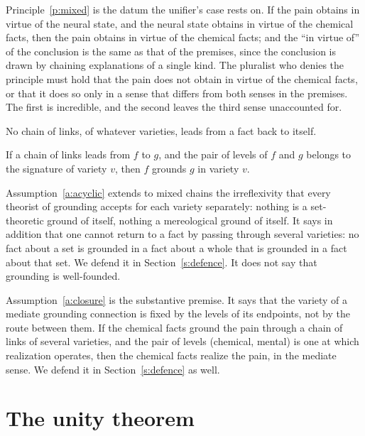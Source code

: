 \documentclass{situationist-preprint}
\begin{document}
Principle~\ref{p:mixed} is the datum the unifier's case rests on. If the pain obtains in virtue of the neural state, and the neural state obtains in virtue of the chemical facts, then the pain obtains in virtue of the chemical facts; and the \enquote{in virtue of} of the conclusion is the same as that of the premises, since the conclusion is drawn by chaining explanations of a single kind. The pluralist who denies the principle must hold that the pain does not obtain in virtue of the chemical facts, or that it does so only in a sense that differs from both senses in the premises. The first is incredible, and the second leaves the third sense unaccounted for.

\begin{assumption}\label{a:acyclic}
No chain of links, of whatever varieties, leads from a fact back to itself.
\end{assumption}

\begin{assumption}\label{a:closure}
If a chain of links leads from $f$ to $g$, and the pair of levels of $f$ and $g$ belongs to the signature of variety $v$, then $f$ grounds $g$ in variety $v$.
\end{assumption}

Assumption~\ref{a:acyclic} extends to mixed chains the irreflexivity that every theorist of grounding accepts for each variety separately: nothing is a set-theoretic ground of itself, nothing a mereological ground of itself. It says in addition that one cannot return to a fact by passing through several varieties: no fact about a set is grounded in a fact about a whole that is grounded in a fact about that set. We defend it in Section~\ref{s:defence}. It does not say that grounding is well-founded.

Assumption~\ref{a:closure} is the substantive premise. It says that the variety of a mediate grounding connection is fixed by the levels of its endpoints, not by the route between them. If the chemical facts ground the pain through a chain of links of several varieties, and the pair of levels (chemical, mental) is one at which realization operates, then the chemical facts realize the pain, in the mediate sense. We defend it in Section~\ref{s:defence} as well.

\section{The unity theorem}\label{s:theorem}
\end{document}
